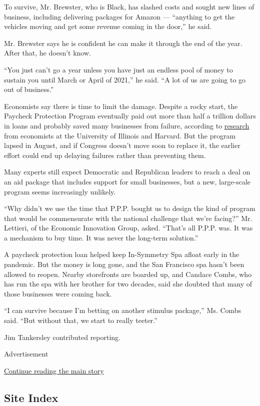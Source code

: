 To survive, Mr. Brewster, who is Black, has slashed costs and sought new
lines of business, including delivering packages for Amazon ---
``anything to get the vehicles moving and get some revenue coming in the
door,'' he said.

Mr. Brewster says he is confident he can make it through the end of the
year. After that, he doesn't know.

``You just can't go a year unless you have just an endless pool of money
to sustain you until March or April of 2021,'' he said. ``A lot of us
are going to go out of business.''

Economists say there is time to limit the damage. Despite a rocky start,
the Paycheck Protection Program eventually paid out more than half a
trillion dollars in loans and probably saved many businesses from
failure, according to
\href{https://www.nber.org/papers/w27623}{research} from economists at
the University of Illinois and Harvard. But the program lapsed in
August, and if Congress doesn't move soon to replace it, the earlier
effort could end up delaying failures rather than preventing them.

Many experts still expect Democratic and Republican leaders to reach a
deal on an aid package that includes support for small businesses, but a
new, large-scale program seems increasingly unlikely.

``Why didn't we use the time that P.P.P. bought us to design the kind of
program that would be commensurate with the national challenge that
we're facing?'' Mr. Lettieri, of the Economic Innovation Group, asked.
``That's all P.P.P. was. It was a mechanism to buy time. It was never
the long-term solution.''

A paycheck protection loan helped keep In-Symmetry Spa afloat early in
the pandemic. But the money is long gone, and the San Francisco spa
hasn't been allowed to reopen. Nearby storefronts are boarded up, and
Candace Combs, who has run the spa with her brother for two decades,
said she doubted that many of those businesses were coming back.

``I can survive because I'm betting on another stimulus package,'' Ms.
Combs said. ``But without that, we start to really teeter.''

Jim Tankersley contributed reporting.

Advertisement

\protect\hyperlink{after-bottom}{Continue reading the main story}

\hypertarget{site-index}{%
\subsection{Site Index}\label{site-index}}

